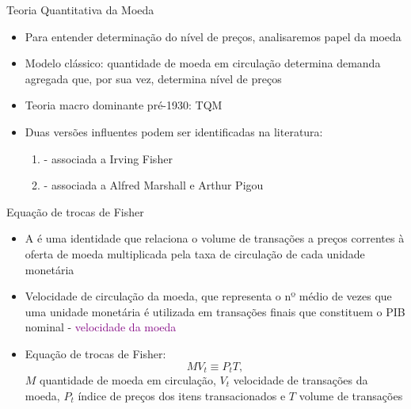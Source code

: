 \documentclass[10pt]{beamer}
\begin{document}
\begin{frame}
    {Teoria Quantitativa da Moeda}
    \begin{itemize}
        \item Para entender determinação do nível de preços, analisaremos papel da moeda\bigskip
        \item Modelo clássico: quantidade de moeda em circulação determina demanda agregada que, por sua vez, determina nível de preços\bigskip
        \item Teoria macro dominante pré-1930: TQM\bigskip
        \item Duas versões influentes podem ser identificadas na literatura:\medskip
        \begin{enumerate}
            \item {} - associada a Irving Fisher\medskip
            \item {} - associada a Alfred Marshall e Arthur Pigou
        \end{enumerate}                
    \end{itemize}
\end{frame}

\begin{frame}
    {Equação de trocas de Fisher}
    \begin{itemize}
        \item A  é uma identidade que relaciona o volume de transações a preços correntes à oferta de moeda multiplicada pela taxa de circulação de cada unidade monetária\bigskip
        \item Velocidade de circulação da moeda, que representa o nº médio de vezes que uma unidade monetária é utilizada em transações finais que constituem o PIB nominal - \textcolor{purple}{velocidade da moeda}\bigskip
        \item Equação de trocas de Fisher:
        \begin{equation}
            MV_t \equiv P_t T,
            \label{aula3_eq4}
        \end{equation}
        $M$ quantidade de moeda em circulação, $V_t$ velocidade de transações da moeda, $P_t$ índice de preços dos itens transacionados e $T$ volume de transações
    \end{itemize}
\end{frame}
\end{document}
